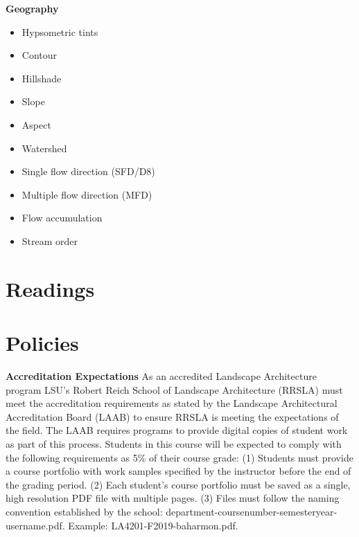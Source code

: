 \documentclass[11pt,article,oneside]{memoir}
\begin{document}
\begin{multicols}{2}
\textbf{Geography}
\begin{itemize}
\item Hypsometric tints
\item Contour
\item Hillshade
\item Slope
\item Aspect
\item Watershed
\item Single flow direction (SFD/D8)
\item Multiple flow direction (MFD)
\item Flow accumulation
\item Stream order
\end{itemize}

\end{multicols}

\clearpage

\section{Readings}
\vspace*{0.5cm}
\nocite{*}
\setlength{}
\printbibliography[heading=none]

\section{Policies}

\noindent \textbf{Accreditation Expectations}
As an accredited Landscape Architecture program
LSU's Robert Reich School of Landscape Architecture (RRSLA) 
must meet the accreditation requirements 
as stated by the Landscape Architectural Accreditation
Board (LAAB) to ensure RRSLA is meeting the expectations of the field. 
The LAAB requires programs to provide digital copies 
of student work as part of this process.
Students in this course will be expected 
to comply with the following requirements
as 5\% of their course grade: 
(1) Students must provide a course portfolio
with work samples specified by the instructor 
before the end of the grading period. 
(2) Each student's course portfolio must be saved as 
a single, high resolution PDF file with multiple pages. 
(3) Files must follow the naming convention
established by the school: department-coursenumber-semesteryear-username.pdf.
Example: LA4201-F2019-baharmon.pdf.\\
\end{document}
